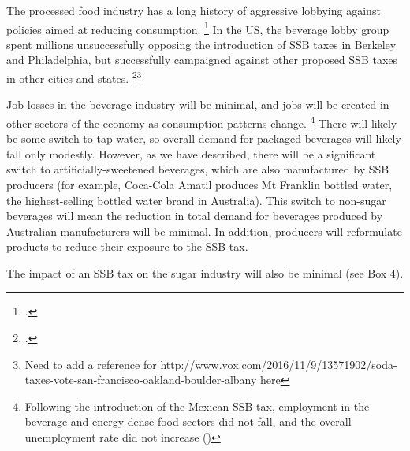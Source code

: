 \documentclass[embargoed]{grattan}
\begin{document}
The processed food industry has a long history of aggressive lobbying against policies aimed at reducing consumption.%
\footcites{Nestle2015Sodapoliticstaking}{Observatory2016spoonfulsugarHow}{Koplan2010Responsefoodbeverage} In the US, the beverage lobby group spent millions unsuccessfully opposing the introduction of SSB taxes in Berkeley and Philadelphia, but successfully campaigned against other proposed SSB taxes in other cities and states.%
\footcites{Nestle2015Sodapoliticstaking}{Nadolny2016Sodataxpasses}{Organization2016FiscalPoliciesDiet}{Steinmetz2014BigSodaFights}{Nadolny2016Sodataxpasses}\footnote{Need to add a reference for http://www.vox.com/2016/11/9/13571902/soda-taxes-vote-san-francisco-oakland-boulder-albany here}


Job losses in the beverage industry will be minimal, and jobs will be created in other sectors of the economy as consumption patterns change.%
\footnote{Following the introduction of the Mexican SSB tax, employment in the beverage and energy-dense food sectors did not fall, and the overall unemployment rate did not increase (\textcite{SaludPublica2016Employmentchangesassociated})} There will likely be some switch to tap water, so overall demand for packaged beverages will likely fall only modestly.
However, as we have described, there will be a significant switch to artificially-sweetened beverages, which are also manufactured by SSB producers (for example, Coca-Cola Amatil produces Mt Franklin bottled water, the highest-selling bottled water brand in Australia).
This switch to non-sugar beverages will mean the reduction in total demand for beverages produced by Australian manufacturers will be minimal.
In addition, producers will reformulate products to reduce their exposure to the SSB tax.

The impact of an SSB tax on the sugar industry will also be minimal (see Box 4).
\end{document}
